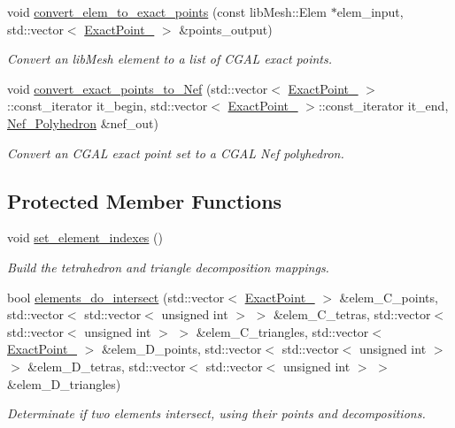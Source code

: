 \begin{DoxyCompactItemize}
void \hyperlink{classcarl_1_1_intersection___tools_a1d6303ff6ffc19b6df42626e29a507ce}{convert\+\_\+elem\+\_\+to\+\_\+exact\+\_\+points} (const lib\+Mesh\+::\+Elem $\ast$elem\+\_\+input, std\+::vector$<$ \hyperlink{_c_g_a_l__typedefs_8h_a162dbf669b38ca5632e00c9c02e000a5}{Exact\+Point\+\_} $>$ \&points\+\_\+output)
\begin{DoxyCompactList}\small\item\em Convert an lib\+Mesh element to a list of C\+G\+A\+L exact points. \end{DoxyCompactList}\item 
void \hyperlink{classcarl_1_1_intersection___tools_af689c53cf00359c518234d8d070c4e53}{convert\+\_\+exact\+\_\+points\+\_\+to\+\_\+\+Nef} (std\+::vector$<$ \hyperlink{_c_g_a_l__typedefs_8h_a162dbf669b38ca5632e00c9c02e000a5}{Exact\+Point\+\_} $>$\+::const\+\_\+iterator it\+\_\+begin, std\+::vector$<$ \hyperlink{_c_g_a_l__typedefs_8h_a162dbf669b38ca5632e00c9c02e000a5}{Exact\+Point\+\_} $>$\+::const\+\_\+iterator it\+\_\+end, \hyperlink{_c_g_a_l__typedefs_8h_ab85d2fceadc71a761aa3a184793f8c5f}{Nef\+\_\+\+Polyhedron} \&nef\+\_\+out)
\begin{DoxyCompactList}\small\item\em Convert an C\+G\+A\+L exact point set to a C\+G\+A\+L Nef polyhedron. \end{DoxyCompactList}\end{DoxyCompactItemize}
\subsection*{Protected Member Functions}
\begin{DoxyCompactItemize}
\item 
void \hyperlink{classcarl_1_1_intersection___tools_ac2eb9f8074d4dc2511b3f36d3cfd5f3b}{set\+\_\+element\+\_\+indexes} ()
\begin{DoxyCompactList}\small\item\em Build the tetrahedron and triangle decomposition mappings. \end{DoxyCompactList}\item 
bool \hyperlink{classcarl_1_1_intersection___tools_a355a95eefdfdd30b4a332fdd99a11150}{elements\+\_\+do\+\_\+intersect} (std\+::vector$<$ \hyperlink{_c_g_a_l__typedefs_8h_a162dbf669b38ca5632e00c9c02e000a5}{Exact\+Point\+\_} $>$ \&elem\+\_\+\+C\+\_\+points, std\+::vector$<$ std\+::vector$<$ unsigned int $>$ $>$ \&elem\+\_\+\+C\+\_\+tetras, std\+::vector$<$ std\+::vector$<$ unsigned int $>$ $>$ \&elem\+\_\+\+C\+\_\+triangles, std\+::vector$<$ \hyperlink{_c_g_a_l__typedefs_8h_a162dbf669b38ca5632e00c9c02e000a5}{Exact\+Point\+\_} $>$ \&elem\+\_\+\+D\+\_\+points, std\+::vector$<$ std\+::vector$<$ unsigned int $>$ $>$ \&elem\+\_\+\+D\+\_\+tetras, std\+::vector$<$ std\+::vector$<$ unsigned int $>$ $>$ \&elem\+\_\+\+D\+\_\+triangles)
\begin{DoxyCompactList}\small\item\em Determinate if two elements intersect, using their points and decompositions. \end{DoxyCompactList}\end{DoxyCompactItemize}
